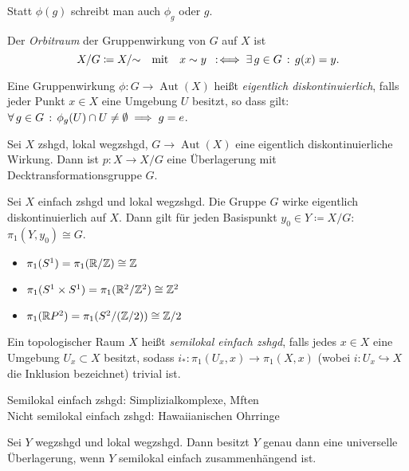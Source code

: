 \documentclass{cheat-sheet}
\DeclareMathOperator{\Aut}{Aut} %
\newcommand{\inlineitem}[1]{\textbullet \enspace #1} %
\begin{document}
\begin{nota}
  Statt $\phi(g)$ schreibt man auch $\phi_g$ oder $g$.
\end{nota}

\begin{defn}
  Der \emph{Orbitraum} der Gruppenwirkung von $G$ auf $X$ ist
  \[
    X / G \coloneqq X / {\sim}
    \quad \text{mit} \quad
    x \sim y \enspace:\!\iff \exists \, {g \in G} \,:\, g(x) = y.
  \]
\end{defn}


\begin{defn}
  Eine Gruppenwirkung $\phi : G \to \Aut(X)$ heißt \emph{eigentlich diskontinuierlich}, falls jeder Punkt $x \in X$ eine Umgebung $U$ besitzt, so dass gilt: $\forall \, {g \in G} \,:\, \phi_g(U) \cap U \not= \emptyset \implies g = e$.
\end{defn}

\begin{prop}
  Sei $X$ zshgd, lokal wegzshgd, $G \to \Aut(X)$ eine eigentlich diskontinuierliche Wirkung. Dann ist $p : X \to X/G$ eine Überlagerung mit Decktransformationsgruppe $G$.
\end{prop}

\begin{satz}
  Sei $X$ einfach zshgd und lokal wegzshgd. Die Gruppe $G$ wirke eigentlich diskontinuierlich auf $X$. Dann gilt für jeden Basispunkt $y_0 \in Y \coloneqq X / G$: $\pi_1(Y, y_0) \cong G$.
\end{satz}

\begin{bspe}
  \begin{itemize}
    \item $\pi_1(S^1) = \pi_1(\mathbb{R} / \mathbb{Z}) \cong \mathbb{Z}$
    \item $\pi_1(S^1 \times S^1) = \pi_1(\mathbb{R}^2 / \mathbb{Z}^2) \cong \mathbb{Z}^2$
    \item $\pi_1(\mathbb{R} P^2) = \pi_1(S^2 / (\mathbb{Z}/2)) \cong \mathbb{Z}/2$
  \end{itemize}
\end{bspe}

\begin{defn}
  Ein topologischer Raum $X$ heißt \emph{semilokal einfach zshgd}, falls jedes $x \in X$ eine Umgebung $U_x \subset X$ besitzt, sodass $i_* : \pi_1(U_x, x) \to \pi_1(X, x)$ (wobei $i : U_x \hookrightarrow X$ die Inklusion bezeichnet) trivial ist.
\end{defn}

\begin{bspe}
  Semilokal einfach zshgd: \enspace
  \inlineitem{Simplizialkomplexe,} \enspace
  \inlineitem{Mften} \\
  Nicht semilokal einfach zshgd: \enspace
  \inlineitem{Hawaiianischen Ohrringe}
\end{bspe}

\begin{satz}
  Sei $Y$ wegzshgd und lokal wegzshgd. Dann besitzt $Y$ genau dann eine universelle Überlagerung, wenn $Y$ semilokal einfach zusammenhängend ist.
\end{satz}
\end{document}
